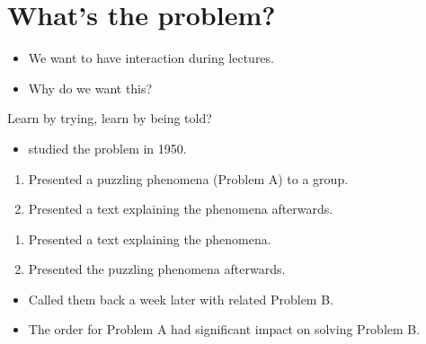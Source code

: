 \mode*

\section{What's the problem?}

\begin{frame}
  \begin{question}
    \begin{itemize}
      \item We want to have interaction during lectures.
      \item Why do we want this?
    \end{itemize}
  \end{question}
\end{frame}

\begin{frame}
  \begin{block}{Learn by trying, learn by being told?}
    \begin{itemize}
      \item \Textcite{Szekely1950} studied the problem in 1950.
    \end{itemize}
    \begin{enumerate}
      \item<1,3> Presented a puzzling phenomena (Problem A) to a group.
      \item<1,3> Presented a text explaining the phenomena afterwards.
    \end{enumerate}
    \begin{enumerate}
      \item<2,3> Presented a text explaining the phenomena.
      \item<2,3> Presented the puzzling phenomena afterwards.
    \end{enumerate}
    \begin{itemize}
      \item<4> Called them back a week later with related Problem B.
      \item<4> The order for Problem A had significant impact on solving 
        Problem B.
    \end{itemize}
  \end{block}
\end{frame}

